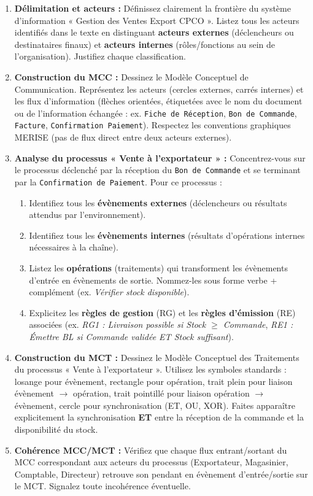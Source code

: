 \documentclass[11pt]{article}
\begin{document}
\begin{enumerate}
    \item \textbf{Délimitation et acteurs :} Définissez clairement la frontière du système d'information « Gestion des Ventes Export CPCO ». Listez tous les acteurs identifiés dans le texte en distinguant \textbf{acteurs externes} (déclencheurs ou destinataires finaux) et \textbf{acteurs internes} (rôles/fonctions au sein de l'organisation). Justifiez chaque classification.
    \item \textbf{Construction du MCC :} Dessinez le Modèle Conceptuel de Communication. Représentez les acteurs (cercles externes, carrés internes) et les flux d'information (flèches orientées, étiquetées avec le nom du document ou de l'information échangée : ex. \texttt{Fiche de Réception}, \texttt{Bon de Commande}, \texttt{Facture}, \texttt{Confirmation Paiement}). Respectez les conventions graphiques MERISE (pas de flux direct entre deux acteurs externes).
    \item \textbf{Analyse du processus « Vente à l'exportateur » :} Concentrez-vous sur le processus déclenché par la réception du \texttt{Bon de Commande} et se terminant par la \texttt{Confirmation de Paiement}. Pour ce processus :
        \begin{enumerate}
            \item Identifiez tous les \textbf{évènements externes} (déclencheurs ou résultats attendus par l'environnement).
            \item Identifiez tous les \textbf{évènements internes} (résultats d'opérations internes nécessaires à la chaîne).
            \item Listez les \textbf{opérations} (traitements) qui transforment les évènements d'entrée en évènements de sortie. Nommez-les sous forme verbe + complément (ex. \emph{Vérifier stock disponible}).
            \item Explicitez les \textbf{règles de gestion} (RG) et les \textbf{règles d'émission} (RE) associées (ex. \emph{RG1 : Livraison possible si Stock $\ge$ Commande}, \emph{RE1 : Émettre BL si Commande validée ET Stock suffisant}).
        \end{enumerate}
    \item \textbf{Construction du MCT :} Dessinez le Modèle Conceptuel des Traitements du processus « Vente à l'exportateur ». Utilisez les symboles standards : losange pour évènement, rectangle pour opération, trait plein pour liaison évènement $\to$ opération, trait pointillé pour liaison opération $\to$ évènement, cercle pour synchronisation (ET, OU, XOR). Faites apparaître explicitement la synchronisation \textbf{ET} entre la réception de la commande et la disponibilité du stock.
    \item \textbf{Cohérence MCC/MCT :} Vérifiez que chaque flux entrant/sortant du MCC correspondant aux acteurs du processus (Exportateur, Magasinier, Comptable, Directeur) retrouve son pendant en évènement d'entrée/sortie sur le MCT. Signalez toute incohérence éventuelle.
\end{enumerate}
\end{document}
